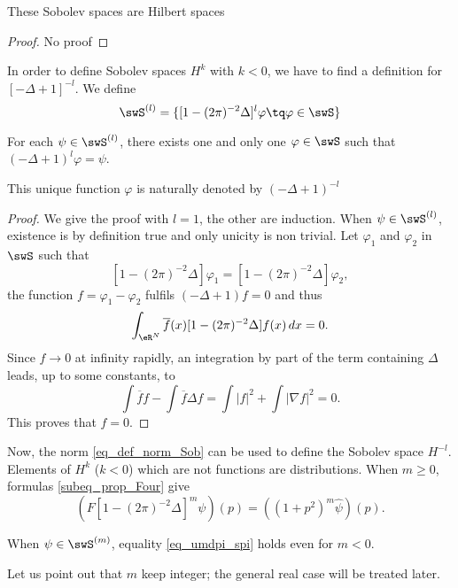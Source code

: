 \begin{proposition}
These Sobolev spaces are Hilbert spaces
\end{proposition}

\begin{proof}
No proof
\end{proof}

In order to define Sobolev spaces $H^k$ with $k<0$, we have to find a definition for $[-\Delta+1]^{-l}$. We define
\[ 
  \swS^{(l)}=\{ [1-(2\pi)^{-2}\Delta]^l\varphi\tq \varphi\in\swS \}
\]

\begin{lemma}
For each $\psi\in\swS^{(l)}$, there exists one and only one $\varphi\in\swS$ such that $(-\Delta+1)^l\varphi=\psi$.
\end{lemma}

This unique function $\varphi$ is naturally denoted by $(-\Delta+1)^{-l}$

\begin{proof}
We give the proof with $l=1$, the other are induction. When $\psi\in\swS^{(l)}$, existence is by definition true and only unicity is non trivial. Let $\varphi_1$ and $\varphi_2$ in $\swS$ such that 
\[ 
  [1-(2\pi)^{-2}\Delta]\varphi_1=[1-(2\pi)^{-2}\Delta]\varphi_2,
\]
the function $f=\varphi_1-\varphi_2$ fulfils $(-\Delta+1)f=0$ and thus
\[ 
  \int_{\eR^N}\overline{ f }(x)[1-(2\pi)^{-2}\Delta]f(x)\,dx=0.
\]
Since $f\to 0$ at infinity rapidly, an integration by part of the term containing $\Delta$ leads, up to some constants, to
\[ 
  \int \overline{ f }f-\int \overline{ f }\Delta f=\int | f |^2+\int | \nabla f |^2=0.
\]
This proves that $f=0$.
\end{proof}

Now, the norm \eqref{eq_def_norm_Sob} can be used to define the Sobolev space $H^{-l}$. Elements of $H^k$ ($k<0$) which are not functions are distributions. When $m\ge0$, formulas  \eqref{subeq_prop_Four} give
\begin{equation}  \label{eq_umdpi_spi}
\left( F[1-(2\pi)^{-2}\Delta]^m\psi \right)(p)=\left( (1+p^2)^m\hat\psi \right)(p).
\end{equation}

\begin{proposition}
When $\psi\in\swS^{(m)}$, equality  \eqref{eq_umdpi_spi} holds even for $m<0$. 
\end{proposition}


Let us point out that $m$ keep integer; the general real case will be treated later.

